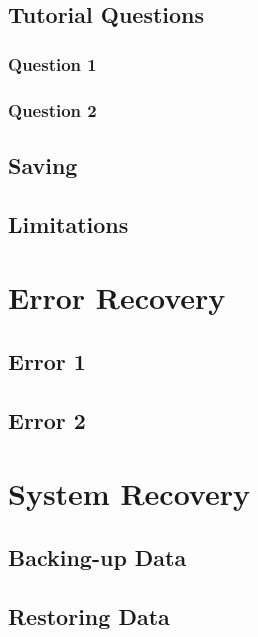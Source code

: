 \subsection{Tutorial Questions}

\subsubsection{Question 1}

\subsubsection{Question 2}

\subsection{Saving}

\subsection{Limitations}

\section{Error Recovery}

\subsection{Error 1}

\subsection{Error 2}

\section{System Recovery}

\subsection{Backing-up Data}

\subsection{Restoring Data}